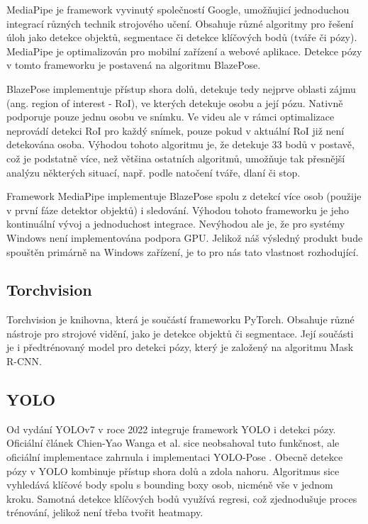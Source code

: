 MediaPipe je framework vyvinutý společností Google, umožňujicí jednoduchou
integrací různých technik strojového učení. Obsahuje různé algoritmy pro řešení
úloh jako detekce objektů, segmentace či detekce klíčových bodů (tváře či
pózy). MediaPipe je optimalizován pro mobilní zařízení a webové aplikace.
Detekce pózy v tomto frameworku je postavená na algoritmu BlazePose.

BlazePose implementuje přístup shora dolů, detekuje tedy nejprve oblasti zájmu
(ang. region of interest - RoI), ve kterých detekuje osobu a její pózu. Nativně
podporuje pouze jednu osobu ve snímku. Ve videu ale v rámci optimalizace
neprovádí detekci RoI pro každý snímek, pouze pokud v aktuální RoI již není
detekována osoba. Výhodou tohoto algoritmu je, že detekuje 33 bodů v postavě,
což je podstatně více, než většina ostatních algoritmů, umožňuje tak přesnější
analýzu některých situací, např. podle natočení tváře, dlaní či stop.

Framework MediaPipe implementuje BlazePose spolu z detekcí více osob (použije v
první fáze detektor objektů) i sledování. Výhodou tohoto frameworku je jeho
kontinuální vývoj a jednoduchost integrace. Nevýhodou ale je, že pro systémy
Windows není implementována podpora GPU. Jelikož náš výsledný produkt bude
spouštěn primárně na Windows zařízení, je to pro nás tato vlastnost
rozhodující.

\subsection{Torchvision}

Torchvision je knihovna, která je součástí frameworku PyTorch. Obsahuje různé
nástroje pro strojové vidění, jako je detekce objektů či segmentace. Její
součásti je i předtrénovaný model pro detekci pózy, který je založený na
algoritmu Mask R-CNN.

\subsection{YOLO}

Od vydání YOLOv7 v roce 2022 integruje framework YOLO i detekci pózy. Oficiální
článek Chien-Yao Wanga et al. \cite{yolov7} sice neobsahoval tuto funkčnost,
ale oficiální implementace zahrnula i implementaci YOLO-Pose \cite{yolo-pose}.
Obecně detekce pózy v YOLO kombinuje přístup shora dolů a zdola nahoru.
Algoritmus sice vyhledává klíčové body spolu s bounding boxy osob, nicméně vše
v jednom kroku. Samotná detekce klíčových bodů využívá regresi, což
zjednodušuje proces trénování, jelikož není třeba tvořit heatmapy.

